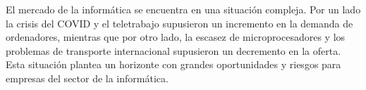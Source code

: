 El mercado de la informática se encuentra en una situación compleja. Por un lado la crisis del COVID y el teletrabajo supusieron un incremento en la demanda de ordenadores, mientras que por otro lado, la escasez de microprocesadores y los problemas de transporte internacional supusieron un decremento en la oferta. Esta situación plantea un horizonte con grandes oportunidades y riesgos para empresas del sector de la informática.

